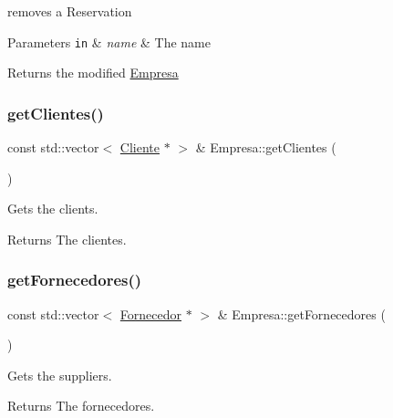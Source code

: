 removes a Reservation 


\begin{DoxyParams}[1]{Parameters}
\mbox{\tt in}  & {\em name} & The name\\
\hline
\end{DoxyParams}
\begin{DoxyReturn}{Returns}
the modified \hyperlink{classEmpresa}{Empresa} 
\end{DoxyReturn}
\mbox{\label{classEmpresa_a472beae89ee1187e1ec3f70e9d4a99ef}} 
\subsubsection{\texorpdfstring{get\+Clientes()}{getClientes()}}
{\footnotesize\ttfamily const std\+::vector$<$ \hyperlink{classCliente}{Cliente} $\ast$ $>$ \& Empresa\+::get\+Clientes (\begin{DoxyParamCaption}{ }\end{DoxyParamCaption})}



Gets the clients. 

\begin{DoxyReturn}{Returns}
The clientes. 
\end{DoxyReturn}
\mbox{\label{classEmpresa_aaf131a375aa70819205744328a4dbc07}} 
\subsubsection{\texorpdfstring{get\+Fornecedores()}{getFornecedores()}}
{\footnotesize\ttfamily const std\+::vector$<$ \hyperlink{classFornecedor}{Fornecedor} $\ast$ $>$ \& Empresa\+::get\+Fornecedores (\begin{DoxyParamCaption}{ }\end{DoxyParamCaption})}



Gets the suppliers. 

\begin{DoxyReturn}{Returns}
The fornecedores. 
\end{DoxyReturn}
\mbox{\label{classEmpresa_a2e8e13ecd162403da0118ceccdccbbcb}} 
